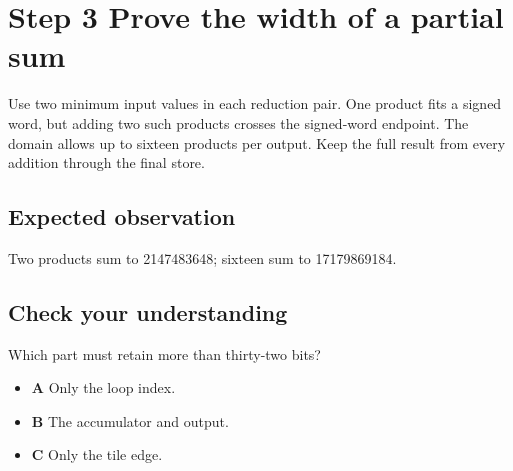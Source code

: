 \section{Step 3 Prove the width of a partial sum}\label{matmul-s03}

Use two minimum input values in each reduction pair. One product fits a signed word, but adding two such products crosses the signed-word endpoint. The domain allows up to sixteen products per output. Keep the full result from every addition through the final store.

\subsection{Expected observation}
Two products sum to 2147483648; sixteen sum to 17179869184.

\subsection{Check your understanding}
Which part must retain more than thirty-two bits?

\begin{itemize}
\item \textbf{A} Only the loop index.
\item \textbf{B} The accumulator and output.
\item \textbf{C} Only the tile edge.
\end{itemize}
